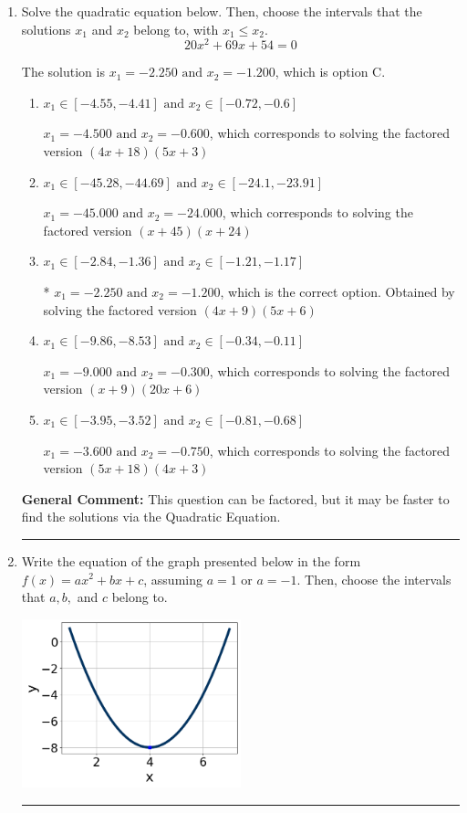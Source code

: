 \documentclass{extbook}[14pt]
\newcommand{\litem}[1]{\item #1

\rule{\textwidth}{0.4pt}}
\begin{document}
\begin{enumerate}\litem{
Solve the quadratic equation below. Then, choose the intervals that the solutions $x_1$ and $x_2$ belong to, with $x_1 \leq x_2$.
\[ 20x^{2} +69 x + 54 = 0 \]

The solution is \( x_1 = -2.250 \text{ and } x_2 = -1.200 \), which is option C.\begin{enumerate}[label=\Alph*.]
\item \( x_1 \in [-4.55, -4.41] \text{ and } x_2 \in [-0.72, -0.6] \)

$x_1 = -4.500 \text{ and } x_2 = -0.600$, which corresponds to solving the factored version $(4x + 18)(5x + 3)$
\item \( x_1 \in [-45.28, -44.69] \text{ and } x_2 \in [-24.1, -23.91] \)

$x_1 = -45.000 \text{ and } x_2 = -24.000$, which corresponds to solving the factored version $(x + 45)(x + 24)$
\item \( x_1 \in [-2.84, -1.36] \text{ and } x_2 \in [-1.21, -1.17] \)

* $x_1 = -2.250 \text{ and } x_2 = -1.200$, which is the correct option. Obtained by solving the factored version $(4x + 9)(5x + 6)$
\item \( x_1 \in [-9.86, -8.53] \text{ and } x_2 \in [-0.34, -0.11] \)

$x_1 = -9.000 \text{ and } x_2 = -0.300$, which corresponds to solving the factored version $(x + 9)(20x + 6)$
\item \( x_1 \in [-3.95, -3.52] \text{ and } x_2 \in [-0.81, -0.68] \)

$x_1 = -3.600 \text{ and } x_2 = -0.750$, which corresponds to solving the factored version $(5x + 18)(4x + 3)$
\end{enumerate}

\textbf{General Comment:} This question can be factored, but it may be faster to find the solutions via the Quadratic Equation.
}
\litem{
Write the equation of the graph presented below in the form $f(x)=ax^2+bx+c$, assuming  $a=1$ or $a=-1$. Then, choose the intervals that $a, b,$ and $c$ belong to.

\begin{center}
    \includegraphics[width=0.5\textwidth]{../Figures/quadraticGraphToEquationC.png}
\end{center}




}
\end{enumerate}
\end{document}
